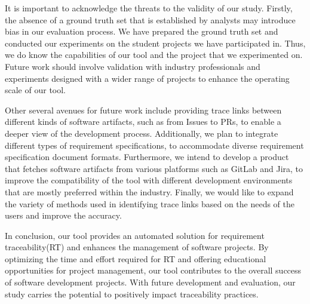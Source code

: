 \documentclass[conference]{IEEEtran}
\begin{document}
It is important to acknowledge the threats to the validity of our study. Firstly, the absence of a ground truth set that is established by analysts may introduce bias in our evaluation process. We have prepared the ground truth set and conducted our experiments on the student projects we have participated in. Thus, we do know the capabilities of our tool and the project that we experimented on. Future work should involve validation with industry professionals and experiments designed with a wider range of projects to enhance the operating scale of our tool. 

Other several avenues for future work include providing trace links between different kinds of software artifacts, such as from Issues to PRs, to enable a deeper view of the development process. Additionally, we plan to integrate different types of requirement specifications, to accommodate diverse requirement specification document formats. Furthermore, we intend to develop a product that fetches software artifacts from various platforms such as GitLab and Jira, to improve the compatibility of the tool with different development environments that are mostly preferred within the industry. Finally, we would like to expand the variety of methods used in identifying trace links based on the needs of the users and improve the accuracy.

In conclusion, our tool provides an automated solution for requirement traceability(RT) and enhances the management of software projects. By optimizing the time and effort required for RT and offering educational opportunities for project management, our tool contributes to the overall success of software development projects. With future development and evaluation, our study carries the potential to positively impact traceability practices.







\end{document}
